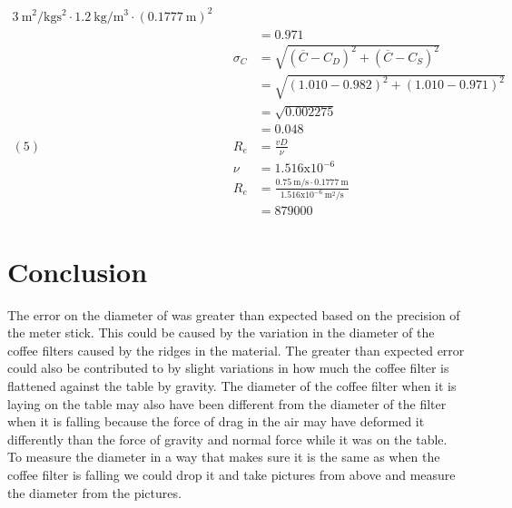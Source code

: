 \documentclass[12pt]{article}
\begin{document}
\begin{alignat*}{3}
{            ~\mathrm{m}^2/
            \mathrm{kg}\mathrm{s}^2 \cdot 1.2~\mathrm{kg}/\mathrm{m}^3 \cdot (0.1777~\mathrm{m})^2}\\ 
            &&& = 0.971\\
            &&\sigma_C &= \sqrt{(\overline{C} - C_D)^2 + (\overline{C} - C_S)^2}\\
            &&& = \sqrt{(1.010 - 0.982)^2 + (1.010 - 0.971)^2}\\
            &&& = \sqrt{0.002275}\\
            &&& = 0.048\\
            (5) && R_e & = \frac{vD}{\nu}\\
            && \nu &= 1.516\mathrm{x}10^{-6}\\
            &&R_e &= \frac{0.75~\mathrm{m/s}\cdot0.1777~\mathrm{m}}{1.516\mathrm{x}10^{-6}~\mathrm{m}^2/\mathrm{s}}\\
            &&& = 879000
        \end{alignat*}
    \section{Conclusion}
        The error on the diameter of was greater than expected based on the precision of the meter stick. This could be caused by the variation in the diameter of the coffee filters caused by the ridges in the material. The greater than expected error could also be contributed to by slight variations in how much the coffee filter is flattened against the table by gravity. The diameter of the coffee filter when it is laying on the table may also have been different from the diameter of the filter when it is falling because the force of drag in the air may have deformed it differently than the force of gravity and normal force while it was on the table. To measure the diameter in a way that makes sure it is the same as when the coffee filter is falling we could drop it and take pictures from above and measure the diameter from the pictures.
\end{document}
